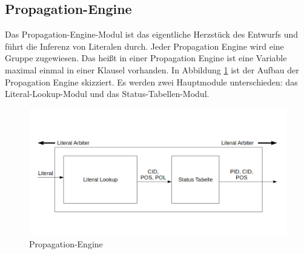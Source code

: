 \subsection{Propagation-Engine}
\label{propagation_engine}
Das Propagation-Engine-Modul ist das eigentliche Herzstück des Entwurfs und führt 
die Inferenz von Literalen durch. Jeder Propagation Engine wird eine Gruppe zugewiesen.
Das heißt in einer Propagation Engine ist eine Variable maximal einmal
in einer Klausel vorhanden. In Abbildung \ref{pe} ist der Aufbau der Propagation Engine 
skizziert. Es werden zwei Hauptmodule unterschieden: das Literal-Lookup-Modul und das
Status-Tabellen-Modul.
\begin{figure}[h]
  \includegraphics[width=\textwidth]{abb/propagation_engine.png}
  \caption{Propagation-Engine}
  \label{pe}
\end{figure}

